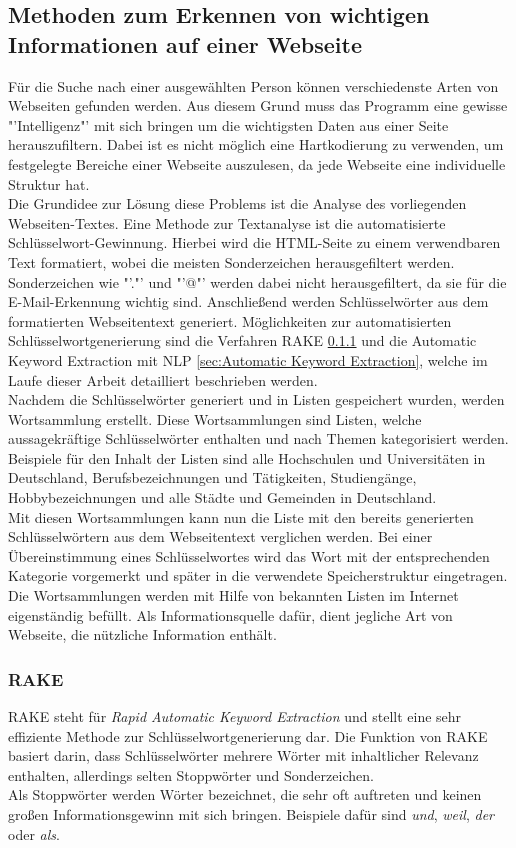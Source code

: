 \subsection{Methoden zum Erkennen von wichtigen Informationen auf einer Webseite}
\label{subsec:ErkennenVonInformation}
Für die Suche nach einer ausgewählten Person können verschiedenste Arten von Webseiten gefunden werden. Aus diesem Grund muss das Programm eine gewisse "'Intelligenz"' mit sich bringen um die wichtigsten Daten aus einer Seite herauszufiltern. Dabei ist es nicht möglich eine Hartkodierung zu verwenden, um festgelegte Bereiche einer Webseite auszulesen, da jede Webseite eine individuelle Struktur hat.\\
Die Grundidee zur Lösung diese Problems ist die Analyse des vorliegenden Webseiten-Textes. Eine Methode zur Textanalyse ist die automatisierte Schlüsselwort-Gewinnung. Hierbei wird die HTML-Seite zu einem verwendbaren Text formatiert, wobei die meisten Sonderzeichen herausgefiltert werden. Sonderzeichen wie "'."' und "'@"' werden dabei nicht herausgefiltert, da sie für die E-Mail-Erkennung wichtig sind. Anschließend werden Schlüsselwörter aus dem formatierten Webseitentext generiert. Möglichkeiten zur automatisierten Schlüsselwortgenerierung sind die Verfahren RAKE \ref{sec:RAKE} und die Automatic Keyword Extraction mit NLP \ref{sec:Automatic Keyword Extraction}, welche im Laufe dieser Arbeit detailliert beschrieben werden.\\
Nachdem die Schlüsselwörter generiert und in Listen gespeichert wurden, werden Wortsammlung erstellt. Diese Wortsammlungen sind Listen, welche aussagekräftige Schlüsselwörter enthalten und nach Themen kategorisiert werden. Beispiele für den Inhalt der Listen sind alle Hochschulen und Universitäten in Deutschland, Berufsbezeichnungen und Tätigkeiten, Studiengänge, Hobbybezeichnungen und alle Städte und Gemeinden in Deutschland.\\
Mit diesen Wortsammlungen kann nun die Liste mit den bereits generierten Schlüsselwörtern aus dem Webseitentext verglichen werden. Bei einer Übereinstimmung eines Schlüsselwortes wird das Wort mit der entsprechenden Kategorie vorgemerkt und später in die verwendete Speicherstruktur eingetragen. \\
Die Wortsammlungen werden mit Hilfe von bekannten Listen im Internet eigenständig befüllt. Als Informationsquelle dafür, dient jegliche Art von Webseite, die nützliche Information enthält.	
\subsubsection{RAKE}
\label{sec:RAKE}
RAKE steht für \textit{Rapid Automatic Keyword Extraction} und stellt eine sehr effiziente Methode zur Schlüsselwortgenerierung dar. Die Funktion von RAKE basiert darin, dass Schlüsselwörter mehrere Wörter mit inhaltlicher Relevanz enthalten, allerdings selten Stoppwörter und Sonderzeichen.\cite{rose2010automatic}\\
Als Stoppwörter werden Wörter bezeichnet, die sehr oft auftreten und keinen großen Informationsgewinn mit sich bringen. Beispiele dafür sind \textit{und}, \textit{weil}, \textit{der} oder \textit{als}.\cite{Stopwords}\\

